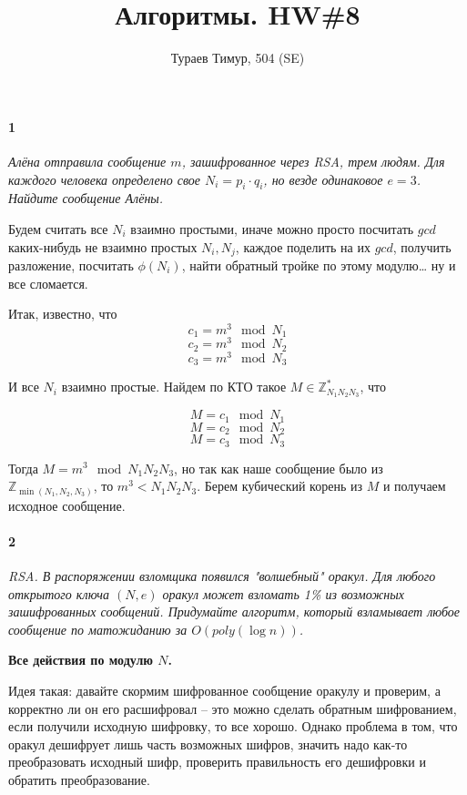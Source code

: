 \documentclass[russian]{article}
\begin{document}
\title{Алгоритмы. HW\#8}
\author{Тураев Тимур, 504 (SE)}
\maketitle

\paragraph*{1}

\textit{Алёна отправила сообщение $m$, зашифрованное через RSA, трем людям. Для каждого человека определено свое $N_i = p_i \cdot q_i$, но везде одинаковое $e = 3$. Найдите сообщение Алёны.}

Будем считать все $N_i$ взаимно простыми, иначе можно просто посчитать $gcd$ каких-нибудь не взаимно простых $N_i, N_j$, каждое поделить на их $gcd$, получить разложение, посчитать $\phi(N_i)$, найти обратный тройке по этому модулю… ну и все сломается.

Итак, известно, что 
\[ c_1 = m^3 \mod N_1 \]
\[ c_2 = m^3 \mod N_2 \]
\[ c_3 = m^3 \mod N_3 \]

И все $N_i$ взаимно простые. Найдем по КТО такое $M \in \mathbb{Z}^*_{N_1 N_2 N_3}$, что

\[ M = c_1 \mod N_1 \]
\[ M = c_2 \mod N_2 \]
\[ M = c_3 \mod N_3 \]

Тогда $M = m^3 \mod N_1 N_2 N_3$, но так как наше сообщение было из $\mathbb{Z}_{\min(N_1, N_2, N_3)}$, то $m^3 < N_1 N_2 N_3$. Берем кубический корень из $M$ и получаем исходное сообщение.

\paragraph*{2}

\textit{RSA. В распоряжении взломщика появился "волшебный" оракул. Для любого открытого ключа $(N,e)$ оракул может взломать 1\% из возможных зашифрованных сообщений. Придумайте алгоритм, который взламывает любое сообщение по матожиданию за $O(poly(\log n))$.}

\textbf{Все действия по модулю $N$.}

Идея такая: давайте скормим шифрованное сообщение оракулу и проверим, а корректно ли он его расшифровал -- это можно сделать обратным шифрованием, если получили исходную шифровку, то все хорошо. Однако проблема в том, что оракул дешифрует лишь часть возможных шифров, значить надо как-то преобразовать исходный шифр, проверить правильность его дешифровки и обратить преобразование.
\end{document}
